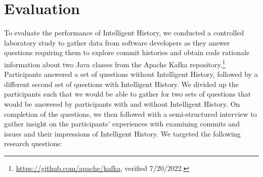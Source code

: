 \chapter{Evaluation}
\label{ch:Evaluation}

To evaluate the performance of Intelligent History, 
we conducted a controlled laboratory study to gather data from software developers as they answer questions
requiring them to explore commit histories and obtain code rationale information 
about two Java classes from the Apache Kafka repository.\footnote{\url{https://github.com/apache/kafka}, verified 7/20/2022.}
Participants answered a set of questions without Intelligent History,
followed by a different second set of questions with Intelligent History.
We divided up the participants such that we would be able to gather for
two sets of questions that would be answered by participants with and without Intelligent History.
On completion of the questions, we then followed with a semi-structured interview
to gather insight on the participants' experiences with examining commits and issues
and their impressions of Intelligent History.
We targeted the following research questions:

